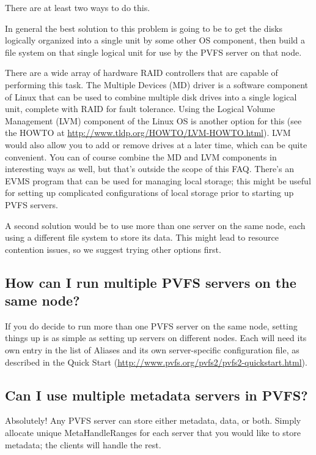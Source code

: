 \documentclass[11pt,letterpaper]{article}
\begin{document}
There are at least two ways to do this.

In general the best solution to this problem is going to be to get the disks
logically organized into a single unit by some other OS component, then build
a file system on that single logical unit for use by the PVFS server on that
node.

There are a wide array of hardware RAID controllers that are capable of
performing this task.
%
The Multiple Devices (MD) driver is a software component of Linux that can be
used to combine multiple disk drives into a single logical unit, complete with
RAID for fault tolerance.
%
Using the Logical Volume Management (LVM) component of the Linux OS is another
option for this (see the HOWTO at
\url{http://www.tldp.org/HOWTO/LVM-HOWTO.html}).  LVM would also allow you to
add or remove drives at a later time, which can be quite convenient.  You
can of course combine the MD and LVM components in interesting ways as well,
but that's outside the scope of this FAQ.
%
There's an EVMS program that can be used for managing local storage; this
might be useful for setting up complicated configurations of local storage
prior to starting up PVFS servers.

A second solution would be to use more than one server on the same node, each
using a different file system to store its data.  This might lead to resource
contention issues, so we suggest trying other options first.

\subsection{How can I run multiple PVFS servers on the same node?}

If you do decide to run more than one PVFS server on the same node,
setting things up is as simple as setting up servers on different
nodes.  Each will need its own entry in the list of Aliases and its
own server-specific configuration file, as described in the Quick Start
(\url{http://www.pvfs.org/pvfs2/pvfs2-quickstart.html}).

\subsection{Can I use multiple metadata servers in PVFS?}

Absolutely!  Any PVFS server can store either metadata, data, or both.
Simply allocate unique MetaHandleRanges for each server that you would like to
store metadata; the clients will handle the rest.
\end{document}
